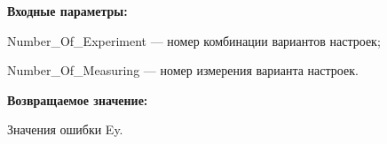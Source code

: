 \textbf{Входные параметры:}

Number\_Of\_Experiment --- номер комбинации вариантов настроек;
 
    Number\_Of\_Measuring --- номер измерения варианта настроек.

\textbf{Возвращаемое значение:}

Значения ошибки Ey.